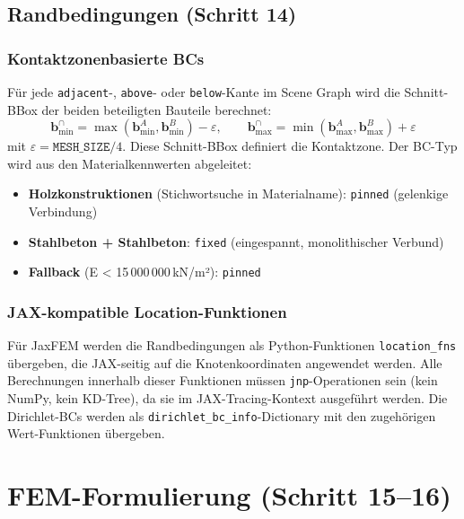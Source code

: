 \documentclass[a4paper,11pt]{article}
\begin{document}
\subsection{Randbedingungen (Schritt 14)}

\subsubsection{Kontaktzonenbasierte BCs}

Für jede \texttt{adjacent}-, \texttt{above}- oder \texttt{below}-Kante im Scene Graph wird die Schnitt-BBox der beiden beteiligten Bauteile berechnet:
\[
  \mathbf{b}^\cap_\text{min} = \max(\mathbf{b}^A_\text{min}, \mathbf{b}^B_\text{min}) - \varepsilon,
  \qquad
  \mathbf{b}^\cap_\text{max} = \min(\mathbf{b}^A_\text{max}, \mathbf{b}^B_\text{max}) + \varepsilon
\]
mit $\varepsilon = \texttt{MESH\_SIZE}/4$. Diese Schnitt-BBox definiert die Kontaktzone. Der BC-Typ wird aus den Materialkennwerten abgeleitet:

\begin{itemize}[noitemsep]
  \item \textbf{Holzkonstruktionen} (Stichwortsuche in Materialname): \texttt{pinned} (gelenkige Verbindung)
  \item \textbf{Stahlbeton + Stahlbeton}: \texttt{fixed} (eingespannt, monolithischer Verbund)
  \item \textbf{Fallback} (E < 15\,000\,000\,kN/m²): \texttt{pinned}
\end{itemize}

\subsubsection{JAX-kompatible Location-Funktionen}

Für JaxFEM werden die Randbedingungen als Python-Funktionen \texttt{location\_fns} übergeben, die JAX-seitig auf die Knotenkoordinaten angewendet werden. Alle Berechnungen innerhalb dieser Funktionen müssen \texttt{jnp}-Operationen sein (kein NumPy, kein KD-Tree), da sie im JAX-Tracing-Kontext ausgeführt werden. Die Dirichlet-BCs werden als \texttt{dirichlet\_bc\_info}-Dictionary mit den zugehörigen Wert-Funktionen übergeben.

\section{FEM-Formulierung (Schritt 15--16)}
\end{document}
